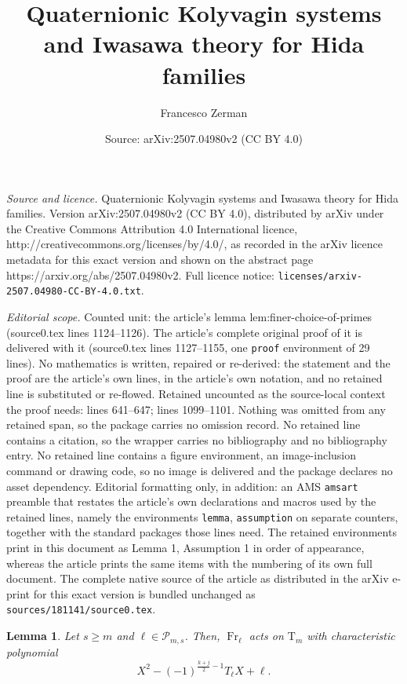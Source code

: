\documentclass[10pt,a4paper]{amsart}
\title{Quaternionic Kolyvagin systems and Iwasawa theory for Hida families}
\author{Francesco Zerman}
\date{Source: arXiv:2507.04980v2 (CC BY 4.0)}
\newtheorem{lemma}{Lemma}
\DeclareMathOperator{\Fr}{Fr}
\newcommand{\T}{\boldsymbol{\mathrm{T}}}
\begin{document}
\maketitle

\noindent\emph{Source and licence.} Quaternionic Kolyvagin systems and Iwasawa theory for Hida families. Version arXiv:2507.04980v2 (CC BY 4.0), distributed by arXiv under the Creative Commons Attribution 4.0 International licence, http://creativecommons.org/licenses/by/4.0/, as recorded in the arXiv licence metadata for this exact version and shown on the abstract page https://arxiv.org/abs/2507.04980v2. Full licence notice: \texttt{licenses/arxiv-2507.04980-CC-BY-4.0.txt}.\par\smallskip

\noindent\textit{Editorial scope.} Counted unit: the article's lemma lem:finer-choice-of-primes (source0.tex lines 1124--1126). The article's complete original proof of it is delivered with it (source0.tex lines 1127--1155, one \texttt{proof} environment of 29 lines). No mathematics is written, repaired or re-derived: the statement and the proof are the article's own lines, in the article's own notation, and no retained line is substituted or re-flowed.  Retained uncounted as the source-local context the proof needs: lines 641--647; lines 1099--1101.  Nothing was omitted from any retained span, so the package carries no omission record.  No retained line contains a citation, so the wrapper carries no bibliography and no bibliography entry.  No retained line contains a figure environment, an image-inclusion command or drawing code, so no image is delivered and the package declares no asset dependency.  Editorial formatting only, in addition: an AMS \texttt{amsart} preamble that restates the article's own declarations and macros used by the retained lines, namely the environments \texttt{lemma}, \texttt{assumption} on separate counters, together with the standard packages those lines need.  The retained environments print in this document as Lemma 1, Assumption 1 in order of appearance, whereas the article prints the same items with the numbering of its own full document.  The complete native source of the article as distributed in the arXiv e-print for this exact version is bundled unchanged as \texttt{sources/181141/source0.tex}.
\begin{lemma}
 \label{lem:charachteristic-polynomial-frobenius-Tm}
     Let $s\ge m$ and $\ell\in\mathcal{P}_{m,s}$. Then, $\Fr_\ell$ acts on $\T_m$ with characteristic polynomial
     \begin{equation*}
         X^2-(-1)^{\frac{k+j}{2}-1} T_\ell X+\ell.
     \end{equation*}
 \end{lemma}
\end{document}
